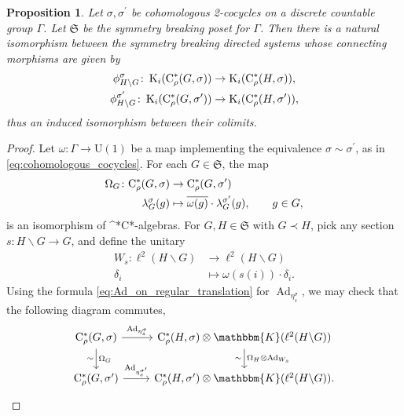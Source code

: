 \documentclass{amsart}
\numberwithin{figure}{section}
\numberwithin{equation}{section}
\numberwithin{table}{section}
\theoremstyle{plain}
\newtheorem{proposition}[equation]{Proposition}
\theoremstyle{definition}
\theoremstyle{remark}
\theoremstyle{nonumber}
\newcommand{\Cpt}{\mathbb{K}}
\newcommand{\K}{\relax\ifmmode\operatorname{K}\else\textup{K}\fi}
\newcommand{\Cst}{\relax\ifmmode\mathrm{C}^*\else\textup{C*}\fi}
\newcommand{\Cstr}{\Cst_\rho} %
\newcommand{\Ad}{\operatorname{Ad}} %
\renewcommand{\mathbb}{\mathbbm} %
\begin{document}
\begin{proposition}\label{prop:cohomologous_symm_breaking}
Let $\sigma,\sigma^\prime$ be cohomologous 2-cocycles on a discrete
countable group $\Gamma$. Let $\mathfrak{S}$ be the symmetry breaking poset
for $\Gamma$. Then there is a natural isomorphism between the
symmetry breaking directed systems whose connecting morphisms are given by
\[
\begin{aligned}
    \phi_{H\backslash G}^\sigma\colon \K_i(\Cstr(G,\sigma))& \to \K_i(\Cstr(H,\sigma)),\\
    \phi_{H\backslash G}^{\sigma^\prime}\colon
    \K_i(\Cstr(G,\sigma^\prime))& \to \K_i(\Cstr(H,\sigma^\prime)),
\end{aligned}
\]
thus an induced isomorphism between their colimits.
\end{proposition}
\begin{proof}
Let $\omega\colon \Gamma\to\mathrm{U}(1)$ be a map implementing the equivalence $\sigma\sim\sigma^\prime$, as in \eqref{eq:cohomologous_cocycles}. For each $G\in\mathfrak{S}$, the map
\begin{equation}\label{eq:cohom_iso_algebra}\begin{aligned}
    \Omega_G\colon \Cstr(G,\sigma)&\to\Cstr(G,\sigma^\prime)\\
    \lambda^\sigma_{G}(g) & \mapsto \overline{\omega(g)}\cdot\lambda^{\sigma^\prime}_{G}(g),\qquad g\in G,
\end{aligned}
\end{equation}
is an isomorphism of \Cst-algebras. 
For \( G,H\in\mathfrak{S} \) with \( G\prec H \),
pick any section $s\colon H\backslash G\to G$, and define the unitary
\begin{align*}
W_s\colon \ell^2(H\backslash G) &\to\ell^2(H\backslash G)\\
\delta_{i} &\mapsto \omega(s(i))\cdot\delta_{i}.
\end{align*}
Using the formula \eqref{eq:Ad_on_regular_translation} for $\Ad_{\eta_s^\sigma}$, we may check that the following diagram commutes,
\begin{equation*}\label{eq:cohomologous_morphism_diagram}
\begin{tikzcd}
\Cstr(G,\sigma)\ar[r,"\Ad_{\eta_s^\sigma}"]\ar[d,"\Omega_G","\sim"'] &
\Cstr(H,\sigma)\otimes \Cpt(\ell^2(H\backslash G))\ar[d,"\Omega_H\otimes
\Ad_{W_s}","\sim"']\\
\Cstr(G,\sigma^\prime)\ar[r,"\Ad_{\eta_s^{\sigma^\prime}}"] &
\Cstr(H,\sigma^\prime)\otimes\Cpt(\ell^2(H\backslash G)).
\end{tikzcd}

\end{equation*}
\end{proof}
\end{document}
